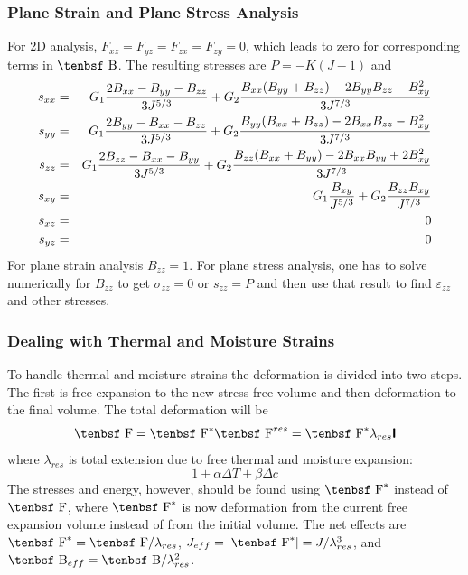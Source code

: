 \documentclass[11pt]{article}
\newcommand{\tens}[1]{\boldsymbol{\mathsf{#1}}}
\def\B{\hbox{\tenbsf B}}
\def\e#1{\varepsilon_{#1}}
\def\F{\hbox{\tenbsf F}}
\def\s#1{\sigma_{#1}}
\begin{document}
\subsubsection{Plane Strain and Plane Stress Analysis}

For 2D analysis, $F_{xz}=F_{yz}=F_{zx}=F_{zy}=0$, which leads to zero for corresponding terms in $\B$. The resulting stresses are $ P = -K (J-1)$ and
\begin{eqnarray}
      s_{xx} & = &  G_1{2B_{xx}-B_{yy}-B_{zz}\over 3J^{5/3}}  
                    + G_2{B_{xx}(B_{yy}+B_{zz})-2B_{yy}B_{zz}-B_{xy}^2\over 3J^{7/3} }\\
      s_{yy} & = &  G_1{2B_{yy}-B_{xx}-B_{zz}\over 3J^{5/3}}   
                     + G_2{B_{yy}(B_{xx}+B_{zz})-2B_{xx}B_{zz}-B_{xy}^2\over 3J^{7/3} }\\
      s_{zz} & = &   G_1{2B_{zz}-B_{xx}-B_{yy}\over 3J^{5/3}}   
                     + G_2{B_{zz}(B_{xx}+B_{yy})-2B_{xx}B_{yy}+2B_{xy}^2\over 3J^{7/3} }\\
       s_{xy} & = &  G_1{B_{xy}\over J^{5/3}} + G_2{B_{zz}B_{xy}\over J^{7/3}}\\
       s_{xz} & = & 0 \\
       s_{yz} & = & 0
\end{eqnarray}
For plane strain analysis $B_{zz}=1$. For plane stress analysis, one has to solve numerically for $B_{zz}$ to get $\s{zz}=0$ or $s_{zz}=P$ and then use that result to find $\e{zz}$ and other stresses.

\subsubsection{Dealing with Thermal and Moisture Strains}

To handle thermal and moisture strains the deformation is divided into two steps. The first is free expansion to the new stress free volume and then deformation to the final volume. The total deformation will be
\begin{equation}
      \F = \F^* \F^{res} = \F^* \lambda_{res}\tens I
\end{equation}
where $\lambda_{res}$ is total extension due to free thermal and moisture expansion:
\begin{equation}
    1 + \alpha\Delta T + \beta \Delta c
\end{equation}
The stresses and energy, however, should be found using $\F^*$ instead of $\F$, where $\F^*$ is now deformation from the current free expansion volume instead of from the initial volume. The net effects are $\F^* = \F/\lambda_{res}$, $J_{eff} = |\F^*| = J/\lambda_{res}^3$, and $\B_{eff} = \B/\lambda_{res}^2$.
\end{document}
